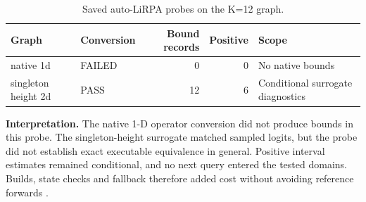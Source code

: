 \begin{table}[H]
\caption{Saved auto-LiRPA probes on the K=12 graph.}
\centering\small
\begin{tabularx}{\textwidth}{@{}YYrrY@{}}\toprule
Graph & Conversion & Bound records & Positive & Scope\\
\midrule
native 1d & FAILED & 0 & 0 & No native bounds\\
singleton height 2d & PASS & 12 & 6 & Conditional surrogate diagnostics\\
\bottomrule\end{tabularx}
\end{table}
\textbf{Interpretation.} The native 1-D operator conversion did not produce bounds in this probe. The singleton-height surrogate matched sampled logits, but the probe did not establish exact executable equivalence in general. Positive interval estimates remained conditional, and no next query entered the tested domains. Builds, state checks and fallback therefore added cost without avoiding reference forwards \cite{localw3}.
